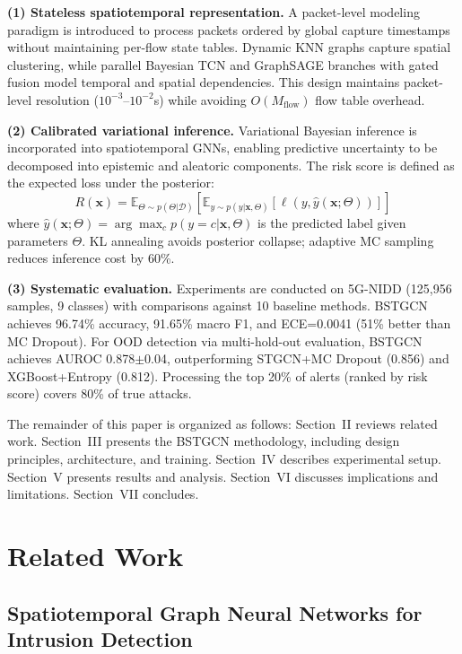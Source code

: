 \documentclass[lettersize,journal]{IEEEtran}
\begin{document}
\textbf{(1) Stateless spatiotemporal representation.} A packet-level modeling paradigm is introduced to process packets ordered by global capture timestamps without maintaining per-flow state tables. Dynamic KNN graphs capture spatial clustering, while parallel Bayesian TCN and GraphSAGE branches with gated fusion model temporal and spatial dependencies. This design maintains packet-level resolution ($10^{-3}$--$10^{-2}$s) while avoiding $O(M_{\text{flow}})$ flow table overhead.

\textbf{(2) Calibrated variational inference.} Variational Bayesian inference is incorporated into spatiotemporal GNNs, enabling predictive uncertainty to be decomposed into epistemic and aleatoric components. The risk score is defined as the expected loss under the posterior:
\begin{equation}
R(\mathbf{x}) = \mathbb{E}_{\Theta \sim p(\Theta|\mathcal{D})} \left[ \mathbb{E}_{y \sim p(y|\mathbf{x},\Theta)} [\ell(y, \hat{y}(\mathbf{x};\Theta))] \right]
\end{equation}
where $\hat{y}(\mathbf{x};\Theta)=\arg\max_c p(y=c|\mathbf{x},\Theta)$ is the predicted label given parameters $\Theta$. KL annealing avoids posterior collapse; adaptive MC sampling reduces inference cost by 60\%.

\textbf{(3) Systematic evaluation.} Experiments are conducted on 5G-NIDD (125,956 samples, 9 classes) with comparisons against 10 baseline methods.
 BSTGCN achieves 96.74\% accuracy, 91.65\% macro F1, and ECE=0.0041 (51\% better than MC Dropout). For OOD detection via multi-hold-out evaluation, BSTGCN achieves AUROC 0.878$\pm$0.04, outperforming STGCN+MC Dropout (0.856) and XGBoost+Entropy (0.812). Processing the top 20\% of alerts (ranked by risk score) covers 80\% of true attacks.

The remainder of this paper is organized as follows: Section~II reviews related work. Section~III presents the BSTGCN methodology, including design principles, architecture, and training. Section~IV describes experimental setup. Section~V presents results and analysis. Section~VI discusses implications and limitations. Section~VII concludes.


\section{Related Work}

\subsection{Spatiotemporal Graph Neural Networks for Intrusion Detection}
\end{document}
